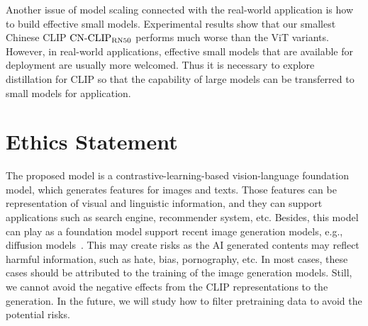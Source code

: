 \documentclass[11pt]{article}
\begin{document}
Another issue of model scaling connected with the real-world application is how to build effective small models. 
Experimental results show that our smallest Chinese CLIP $\text{CN-CLIP}\rm_{RN50}$ performs much worse than the ViT variants. 
However, in real-world applications, effective small models that are available for deployment are usually more welcomed. 
Thus it is necessary to explore distillation for CLIP so that the capability of large models can be transferred to small models for application. 




\section*{Ethics Statement}
The proposed model is a contrastive-learning-based vision-language foundation model, which generates features for images and texts. Those features can be representation of visual and linguistic information, and they can support applications such as search engine, recommender system, etc. 
Besides, this model can play as a foundation model support recent image generation models, e.g., diffusion models~\citep{dalle2}. 
This may create risks as the AI generated contents may reflect harmful information, such as hate, bias, pornography, etc. 
In most cases, these cases should be attributed to the training of the image generation models. 
Still, we cannot avoid the negative effects from the CLIP representations to the generation. 
In the future, we will study how to filter pretraining data to avoid the potential risks. 
\end{document}
